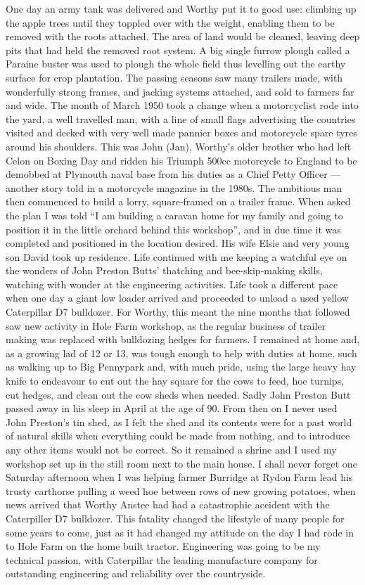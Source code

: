 One day an army tank was delivered and Worthy put it to good use: climbing up
the apple trees until they toppled over with the weight, enabling them to be
removed with the roots attached. The area of land would be cleaned, leaving
deep pits that had held the removed root system. A big single furrow plough
called a Paraine buster was used to plough the whole field thus levelling out
the earthy surface for crop plantation. The passing seasons saw many trailers
made, with wonderfully strong frames, and jacking systems attached, and sold to
farmers far and wide. The month of March 1950 took a change when a motorcyclist
rode into the yard, a well travelled man, with a line of small flags
advertising the countries visited and decked with very well made pannier boxes
and motorcycle spare tyres around his shoulders. This was John (Jan), Worthy's
older brother who had left Celon on Boxing Day and ridden his Triumph 500cc
motorcycle to England to be demobbed at Plymouth naval base from his duties as
a Chief Petty Officer --- another story told in a motorcycle magazine in the
1980s. The ambitious man then commenced to build a lorry, square-framed on a
trailer frame. When asked the plan I was told ``I am building a caravan home
for my family and going to position it in the little orchard behind this
workshop'', and in due time it was completed and positioned in the location
desired. His wife Elsie and very young son David took up residence. Life
continued with me keeping a watchful eye on the wonders of John Preston Butts'
thatching and bee-skip-making skills, watching with wonder at the engineering
activities. Life took a different pace when one day a giant low loader arrived
and proceeded to unload a used yellow Caterpillar D7 bulldozer. For Worthy,
this meant the nine months that followed saw new activity in Hole Farm
workshop, as the regular business of trailer making was replaced with
bulldozing hedges for farmers. I remained at home and, as a growing lad of 12
or 13, was tough enough to help with duties at home, such as walking up to Big
Pennypark and, with much pride, using the large heavy hay knife to endeavour to
cut out the hay square for the cows to feed, hoe turnips, cut hedges, and clean
out the cow sheds when needed. Sadly John Preston Butt passed away in his sleep
in April at the age of 90. From then on I never used John Preston's tin shed,
as I felt the shed and its contents were for a past world of natural skills
when everything could be made from nothing, and to introduce any other items
would not be correct. So it remained a shrine and I used my workshop set up in
the still room next to the main house. I shall never forget one Saturday
afternoon when I was helping farmer Burridge at Rydon Farm lead his trusty
carthorse pulling a weed hoe between rows of new growing potatoes, when news
arrived that Worthy Anstee had had a catastrophic accident with the Caterpiller
D7 bulldozer. This fatality changed the lifestyle of many people for some years
to come, just as it had changed my attitude on the day I had rode in to Hole
Farm on the home built tractor. Engineering was going to be my technical
passion, with Caterpillar the leading manufacture company for outstanding
engineering and reliability over the countryside.
